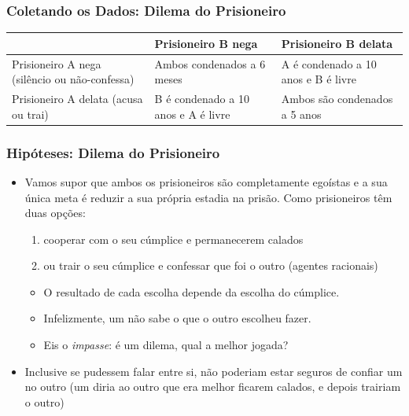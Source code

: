 
\begin{frame}

    \frametitle{Coletando os Dados: Dilema do Prisioneiro}
    
    
      \begin{center}
        \begin{tabular}{p{2cm} || p{3cm} | p{3cm}} \hline \hline
  & Prisioneiro B nega   &  Prisioneiro B delata   \\ \hline \hline
        Prisioneiro A nega (silêncio ou não-confessa)  &  Ambos condenados a 6 meses  & A é condenado a 10 anos e B é livre   \\ \hline 
         Prisioneiro A delata (acusa ou trai)     & B é condenado a 10 anos e A é livre & Ambos são condenados a 5 anos \\ 
         \hline \hline
        \end{tabular}
      \end{center}

\end{frame}


\begin{frame}

    \frametitle{Hipóteses: Dilema do Prisioneiro}
    
    
    \begin{itemize}
      \item  Vamos supor que ambos os prisioneiros são completamente egoístas e a sua única meta é reduzir a sua própria estadia na prisão. Como prisioneiros têm duas opções:
      
      \begin{enumerate}
         \item cooperar com o seu cúmplice e permanecerem calados
         \item ou trair o seu cúmplice e confessar que foi o outro (agentes racionais)
       \end{enumerate}   
       
       \begin{itemize}
         \item   O resultado de cada escolha depende da escolha do cúmplice.     
         \item   Infelizmente, um não sabe o que o outro escolheu fazer. 
       
         \item Eis o \textit{impasse}: é um dilema, qual a melhor jogada?
         
       \end{itemize}
       
       \item Inclusive se pudessem falar entre si, não poderiam estar seguros de confiar um no outro (um diria ao outro que era melhor ficarem calados, e depois trairiam o outro)        
       
    \end{itemize}


\end{frame}

